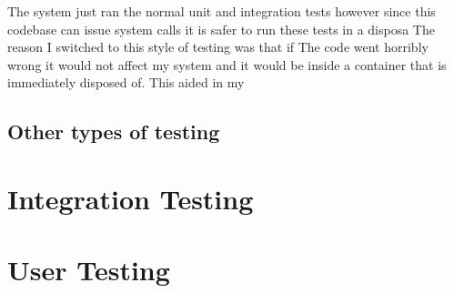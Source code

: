 The system just ran the normal unit and integration tests however since this codebase can issue system calls it is safer to run these tests in a disposa  
The reason I switched to this style of testing was that if The code went horribly wrong it would not affect my system and it would be inside a container that is immediately disposed of.
This aided in my

\subsection{Other types of testing}

\section{Integration Testing}

\section{User Testing}